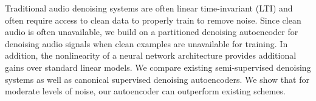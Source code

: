 Traditional audio denoising systems are often linear time-invariant (LTI) and often require access to clean data to properly train to remove noise. Since clean audio is often unavailable, we build on a partitioned denoising autoencoder for denoising audio signals when clean examples are unavailable for training. In addition, the nonlinearity of a neural network architecture provides additional gains over standard linear models. We compare existing semi-supervised denoising systems as well as canonical supervised denoising autoencoders. We show that for moderate levels of noise, our autoencoder can outperform existing schemes.
